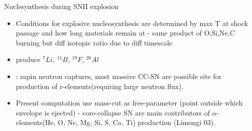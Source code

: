 \begin{frame}{Nuclesynthesis during SNII explosion} 
\begin{itemize}
\item Conditions for explosive nucleosynthesis are determined by max T at shock passage and how long materials remain at - same product of O,Si,Ne,C burning but diff isotopic ratio due to diff timescale
\item {} produce $^7Li$, $^{11}B$, $^{19}F$, $^{26}Al$
\item {}: rapin neutron captures, most massive CC-SN are possible site for production of r-elements(requiring large neutron flux).
\item Present computation use mass-cut as free-parameter (point outside which envelope is ejected) - core-collapse SN are main contributors of $\alpha$-elements(He, O, Ne, Mg, Si, S, Ca, Ti) production (Limongi 03).
\end{itemize}
\end{frame}

